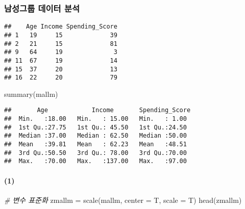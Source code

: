 \documentclass[
]{article}
\newenvironment{Shaded}{\begin{snugshade}}{\end{snugshade}}
\newcommand{\AttributeTok}[1]{\textcolor[rgb]{0.77,0.63,0.00}{#1}}
\newcommand{\CommentTok}[1]{\textcolor[rgb]{0.56,0.35,0.01}{\textit{#1}}}
\newcommand{\DecValTok}[1]{\textcolor[rgb]{0.00,0.00,0.81}{#1}}
\newcommand{\FunctionTok}[1]{\textcolor[rgb]{0.00,0.00,0.00}{#1}}
\newcommand{\NormalTok}[1]{#1}
\newcommand{\OtherTok}[1]{\textcolor[rgb]{0.56,0.35,0.01}{#1}}
\newcommand{\SpecialCharTok}[1]{\textcolor[rgb]{0.00,0.00,0.00}{#1}}
\newcommand{\StringTok}[1]{\textcolor[rgb]{0.31,0.60,0.02}{#1}}
\begin{document}
\hypertarget{uxb0a8uxc131uxadf8uxb8f9-uxb370uxc774uxd130-uxbd84uxc11d}{%
\subsubsection{남성그룹 데이터
분석}\label{uxb0a8uxc131uxadf8uxb8f9-uxb370uxc774uxd130-uxbd84uxc11d}}

\begin{Shaded}
\end{Shaded}

\begin{verbatim}
##    Age Income Spending_Score
## 1   19     15             39
## 2   21     15             81
## 9   64     19              3
## 11  67     19             14
## 15  37     20             13
## 16  22     20             79
\end{verbatim}

\begin{Shaded}
\begin{Highlighting}[]
\FunctionTok{summary}\NormalTok{(mallm)}
\end{Highlighting}
\end{Shaded}

\begin{verbatim}
##       Age            Income       Spending_Score 
##  Min.   :18.00   Min.   : 15.00   Min.   : 1.00  
##  1st Qu.:27.75   1st Qu.: 45.50   1st Qu.:24.50  
##  Median :37.00   Median : 62.50   Median :50.00  
##  Mean   :39.81   Mean   : 62.23   Mean   :48.51  
##  3rd Qu.:50.50   3rd Qu.: 78.00   3rd Qu.:70.00  
##  Max.   :70.00   Max.   :137.00   Max.   :97.00
\end{verbatim}

\hypertarget{section-5}{%
\paragraph{(1)}\label{section-5}}

\begin{Shaded}
\begin{Highlighting}[]
\CommentTok{\# 변수 표준화}
\NormalTok{zmallm }\OtherTok{=} \FunctionTok{scale}\NormalTok{(mallm, }\AttributeTok{center =}\NormalTok{ T, }\AttributeTok{scale =}\NormalTok{ T)}
\FunctionTok{head}\NormalTok{(zmallm)}
\end{Highlighting}
\end{Shaded}
\end{document}
